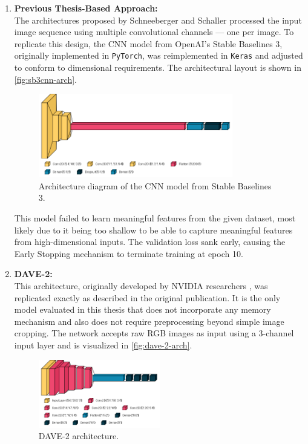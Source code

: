 \begin{enumerate}
  \item \textbf{Previous Thesis-Based Approach:} \\
    The architectures proposed by Schneeberger \autocite{schneeberger2024end} and Schaller \autocite{schaller2023train} processed the input image sequence using multiple convolutional channels --- one per image. To replicate this design, the CNN model from OpenAI’s Stable Baselines 3, originally implemented in \texttt{PyTorch}, was reimplemented in \texttt{Keras} and adjusted to conform to dimensional requirements. The architectural layout is shown in \autoref{fig:sb3cnn-arch}.

    \begin{figure}[htbp]
      \centering
      \includegraphics[width=0.8\textwidth]{Images/SB3CNN_architecture.png}
      \caption{Architecture diagram of the CNN model from Stable Baselines 3.}
      \label{fig:sb3cnn-arch}
    \end{figure}

    This model failed to learn meaningful features from the given dataset, most likely due to it being too shallow to be able to capture meaningful features from high-dimensional inputs. The validation loss sank early, causing the Early Stopping mechanism to terminate training at epoch 10.

  \item \textbf{DAVE-2:} \\
    This architecture, originally developed by NVIDIA researchers \autocite{bojarski2016endendlearningselfdriving}, was replicated exactly as described in the original publication. It is the only model evaluated in this thesis that does not incorporate any memory mechanism and also does not require preprocessing beyond simple image cropping. The network accepts raw RGB images as input using a 3-channel input layer and is visualized in \autoref{fig:dave-2-arch}.

    \begin{figure}[htbp]
      \centering
      \includegraphics[width=0.5\textwidth]{Images/DAVE-2_architecture.png}
      \caption{DAVE-2 architecture.}
      \label{fig:dave-2-arch}
    \end{figure}


\end{enumerate}
